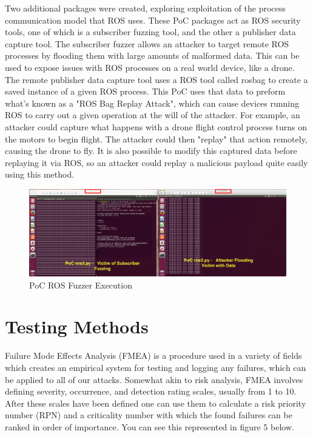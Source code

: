 \documentclass[IEEEtran,letterpaper,10pt,notitlepage,draftclsnofoot,onecolumn]{article}
\begin{document}
Two additional packages were created, exploring exploitation of the process communication model that ROS uses. These PoC packages act as ROS security tools, one of which is a subscriber
fuzzing tool, and the other a publisher data capture tool. The subscriber fuzzer allows an attacker to target remote ROS processes by flooding them with large amounts of malformed data.
This can be used to expose issues with ROS processes on a real world device, like a drone. The remote publisher data capture tool uses a ROS tool called rosbag to create a saved instance
of a given ROS process. This PoC uses that data to preform what's known as a "ROS Bag Replay Attack", which can cause devices running ROS to carry out a given operation at the will of the attacker.
For example, an attacker could capture what happens with a drone flight control process turns on the motors to begin flight. The attacker could then "replay" that action remotely, causing the drone
to fly. It is also possible to modify this captured data before replaying it via ROS, so an attacker could replay a malicious payload quite easily using this method.

\begin{figure}[H]
  \centering
    \includegraphics[width=\textwidth]{poc3}
    \caption{PoC ROS Fuzzer Execution}
\end{figure}

\section{Testing Methods}
Failure Mode Effects Analysis (FMEA) is a procedure used in a variety of fields which creates an empirical system for testing and logging any failures, which can be applied to all of our attacks.
Somewhat akin to risk analysis, FMEA involves defining severity, occurrence, and detection rating scales, usually from 1 to 10.
After these scales have been defined one can use them to calculate a risk priority number (RPN) and a criticality number with which the found failures can be ranked in order of importance.
You can see this represented in figure 5 below.
\end{document}
